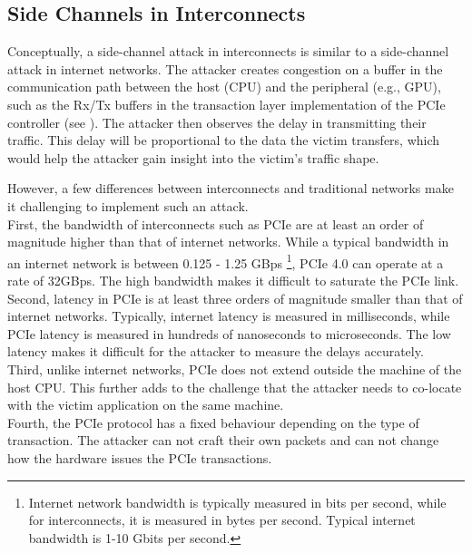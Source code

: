 \subsection{Side Channels in Interconnects}
\label{subsec:interconnect-sc-background-side-channels}

Conceptually, a side-channel attack in interconnects is similar to a side-channel attack in internet networks. 
The attacker creates congestion on a buffer in the communication path between the host (CPU) and the peripheral (e.g., GPU), such as the Rx/Tx buffers in the transaction layer implementation of the PCIe controller (see ).
The attacker then observes the delay in transmitting their traffic.
This delay will be proportional to the data the victim transfers, which would help the attacker gain insight into the victim's traffic shape.

However, a few differences between interconnects and traditional networks make it challenging to implement such an attack. \\
First, the bandwidth of interconnects such as PCIe are at least an order of magnitude higher than that of internet networks.
While a typical bandwidth in an internet network is between 0.125 - 1.25 GBps 
\footnote{Internet network bandwidth is typically measured in bits per second, while for interconnects, it is measured in bytes per second. Typical internet bandwidth is 1-10 Gbits per second.},
PCIe 4.0 can operate at a rate of 32GBps.
The high bandwidth makes it difficult to saturate the PCIe link. \\
Second, latency in PCIe is at least three orders of magnitude smaller than that of internet networks.
Typically, internet latency is measured in milliseconds, while PCIe latency is measured in hundreds of nanoseconds to microseconds.
The low latency makes it difficult for the attacker to measure the delays accurately. \\
Third, unlike internet networks, PCIe does not extend outside the machine of the host CPU.
This further adds to the challenge that the attacker needs to co-locate with the victim application on the same machine. \\
Fourth, the PCIe protocol has a fixed behaviour depending on the type of transaction.
The attacker can not craft their own packets and can not change how the hardware issues the PCIe transactions.


